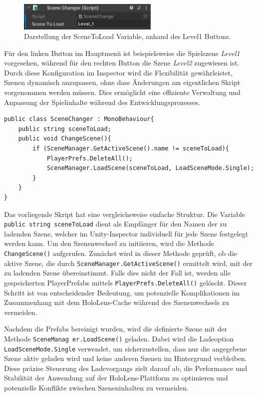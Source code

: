 \begin{figure}[H]
    \centering
    \includegraphics[width=0.6\textwidth]{images/sceneToLoad.png}
    \caption{Darstellung der SceneToLoad Variable, anhand des Level1 Buttons.}
    \label{fig:scenetoload}
\end{figure}

Für den linken Button im Hauptmenü ist beispielsweise die Spielszene \textit{Level1} vorgesehen, während für den rechten
Button die Szene \textit{Level2} zugewiesen ist. Durch diese Konfiguration im Inspector wird die Flexibilität gewährleistet,
Szenen dynamisch anzupassen, ohne dass Änderungen am eigentlichen Skript vorgenommen werden müssen. Dies ermöglicht eine
effiziente Verwaltung und Anpassung der Spielinhalte während des Entwicklungsprozesses.

\begin{lstlisting}[style=csharp, caption=Auf Knopfdruck Szene wechseln., label=code:scenechange]
public class SceneChanger : MonoBehaviour{
    public string sceneToLoad;
    public void ChangeScene(){
        if (SceneManager.GetActiveScene().name != sceneToLoad){
            PlayerPrefs.DeleteAll();
            SceneManager.LoadScene(sceneToLoad, LoadSceneMode.Single);
        }
    }
}

\end{lstlisting}

Das vorliegende Skript hat eine vergleichsweise einfache Struktur. Die Variable \texttt{public string sceneToLoad} dient als Empfänger für den Namen der zu ladenden Szene, welcher im Unity-Inspector individuell für jede Szene festgelegt werden kann. Um den Szenenwechsel zu initiieren, wird die Methode \texttt{ChangeScene()} aufgerufen. Zunächst wird in dieser Methode geprüft, ob die aktive Szene, die durch \texttt{SceneManager.GetActiveScene()} ermittelt wird, mit der zu ladenden Szene übereinstimmt. Falls dies nicht der Fall ist, werden alle gespeicherten PlayerPrefabs mittels \texttt{PlayerPrefs.DeleteAll()} gelöscht. Dieser Schritt ist von entscheidender Bedeutung, um potenzielle Komplikationen im Zusammenhang mit dem HoloLens-Cache während des Szenenwechsels zu vermeiden.

Nachdem die Prefabs bereinigt wurden, wird die definierte Szene mit der Methode \texttt{SceneManag er.LoadScene()} geladen. Dabei wird die Ladeoption \texttt{LoadSceneMode.Single} verwendet, um sicherzustellen, dass nur die angegebene Szene aktiv geladen wird und keine anderen Szenen im Hintergrund verbleiben. Diese präzise Steuerung des Ladevorgangs zielt darauf ab, die Performance und Stabilität der Anwendung auf der HoloLens-Plattform zu optimieren und potenzielle Konflikte zwischen Szeneninhalten zu vermeiden.

